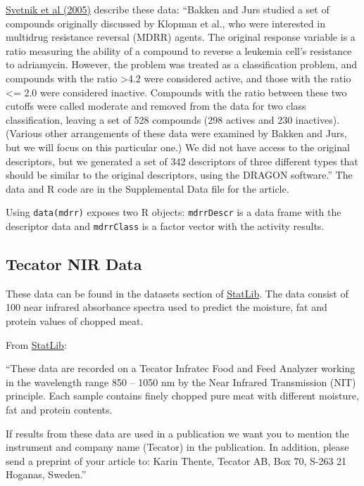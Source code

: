 \documentclass[12pt]{article}
\begin{document}
\href{http://pubs.acs.org/cgi-bin/abstract.cgi/jcisd8/2005/45/i03/abs/ci0500379.html}{Svetnik et al (2005)} describe these data: ``Bakken and Jurs studied a set of compounds originally discussed by Klopman et al., who were interested in multidrug resistance reversal (MDRR) agents. The original response variable is a ratio measuring the ability of a compound to reverse a leukemia cell's resistance to adriamycin. However, the problem was treated as a classification problem, and compounds with the ratio >4.2 were considered active, and those with the ratio <= 2.0 were considered inactive. Compounds with the ratio between these two cutoffs were called moderate and removed from the data for two class classification, leaving a set of 528 compounds (298 actives and 230 inactives). (Various other arrangements of these data were examined by Bakken and Jurs, but we will focus on this particular one.) We did not have access to the original descriptors, but we generated a set of 342 descriptors of three different types that should be similar to the original descriptors, using the DRAGON software.'' The data and R code are in the Supplemental Data file for the article.

Using \texttt{data(mdrr)} exposes two R objects: \texttt{mdrrDescr} is a data frame with the descriptor data and \texttt{mdrrClass} is a factor vector with the activity results.

\subsection{Tecator NIR Data}

These data can be found in the datasets section of \href{http://lib.stat.cmu.edu/datasets/tecator} {StatLib}. The data consist of 100 near infrared absorbance spectra used to predict the moisture, fat and protein values of chopped meat.

From \href{http://lib.stat.cmu.edu/datasets/tecator} {StatLib}:

``These data are recorded on a Tecator Infratec Food and Feed Analyzer 
working in the wavelength range 850 -- 1050 nm by the Near Infrared 
Transmission (NIT) principle. Each sample contains finely chopped pure 
meat with different moisture, fat and protein contents.

If results from these data are used in a publication we want you to 
mention the instrument and company name (Tecator) in the publication. 
In addition, please send a preprint of your article to:  Karin Thente, Tecator AB, Box 70, S-263 21 Hoganas, Sweden.''
\end{document}
